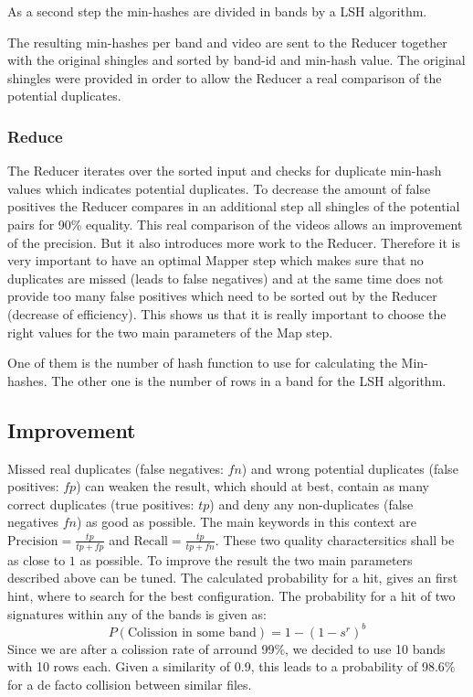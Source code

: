 \documentclass[a4paper, 11pt]{article}
\begin{document}
As a second step the min-hashes are divided in bands by a LSH algorithm.

The resulting min-hashes per band and video are sent to the Reducer together with the original shingles and sorted by band-id and min-hash value. The original shingles were provided in order to allow the Reducer a real comparison of the potential duplicates.

\subsubsection{Reduce}

The Reducer iterates over the sorted input and checks for duplicate min-hash values which indicates potential duplicates. To decrease the amount of false positives the Reducer compares in an additional step all shingles of the potential pairs for 90\% equality. This real comparison of the videos allows an improvement of the precision. But it also introduces more work to the Reducer. 
Therefore it is very important to have an optimal Mapper step which makes sure that no duplicates are missed (leads to false negatives) and at the same time does not provide too many false positives which need to be sorted out by the Reducer (decrease of efficiency).
This shows us that it is really important to choose the right values for the two main parameters of the Map step.

One of them is the number of hash function to use for calculating the Min-hashes.
The other one is the number of rows in a band for the LSH algorithm.


\subsection{Improvement}

Missed real duplicates (false negatives: $fn$) and wrong potential duplicates (false positives: $fp$) can weaken the result, which should at best, contain as many correct duplicates (true positives: $tp$) and deny any non-duplicates  (false negatives $fn$) as good as possible. The main keywords in this context are $\text{Precision}=\frac{tp}{tp+fp}$ and $\text{Recall}=\frac{tp}{tp+fn}$. These two quality charactersitics shall be as close to $1$ as possible.
To improve the result the two main parameters described above can be tuned.
The calculated probability for a hit, gives an first hint, where to search for the best configuration. The probability for a hit of two signatures within any of the bands is given as:
\begin{equation*}P(\text{Colission in some band}) = 1 - (1-s^r)^b \end{equation*}
Since we are after a colission rate of arround 99\%, we decided to use 10 bands with 10 rows each. Given a similarity of 0.9, this leads to a probability of 98.6\% for a de facto collision between similar files.  
\end{document}
